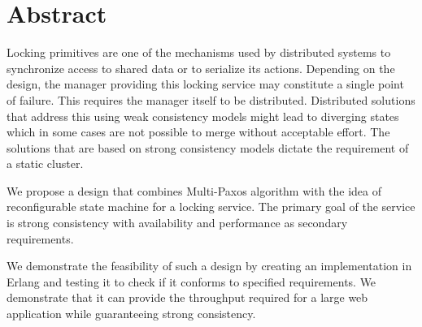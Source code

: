 \chapter{Abstract}

Locking primitives are one of the mechanisms used by distributed systems
to synchronize access to shared data or to serialize its actions. Depending
on the design, the manager providing this locking service may constitute
a single point of failure. This requires the manager itself to be
distributed. Distributed solutions that address this using weak consistency 
models might lead to diverging states which in some cases are not possible to
merge without acceptable effort. The solutions that are based on strong
consistency models dictate the requirement of a static cluster.

We propose a design that combines Multi-Paxos algorithm with the idea of
reconfigurable state machine for a locking service. The primary goal of
the service is strong consistency with availability and performance as
secondary requirements.

We demonstrate the feasibility of such a design by creating an implementation
in Erlang and testing it to check if it conforms to specified requirements.
We demonstrate that it can provide the throughput required for a large
web application while guaranteeing strong consistency.
